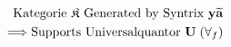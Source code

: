 \documentclass[preview]{standalone}
\begin{document}
\begin{align*}
\special{dvisvgm:raw <g id='unique000'>}\text{Kategorie }\mathfrak{K}\text{ Generated by Syntrix }\mathbf{y}\widetilde{\mathbf{a}}\\\Longrightarrow\text{Supports Universalquantor }\mathbf{U}\;(\forall_f)\special{dvisvgm:raw </g>}
\end{align*}
\end{document}
